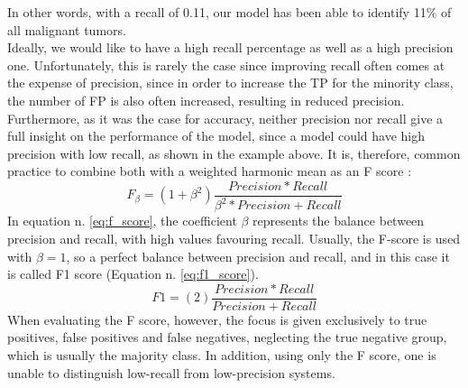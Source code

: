 In other words, with a recall of 0.11, our model has been able to identify 11\% of all malignant tumors. \\
Ideally, we would like to have a high recall percentage as well as a high precision one. Unfortunately, this is rarely the case since improving recall often comes at the expense of precision, since in order to increase the TP for the minority class, the number of FP is also often increased, resulting in reduced precision. \cite{10.5555/2559492}\\
Furthermore, as it was the case for accuracy, neither precision nor recall give a full insight on the performance of the model, since a model could have high precision with low recall, as shown in the example above. It is, therefore, common practice to combine both with a weighted harmonic mean as an F score \cite{Rijsbergen1974FOUNDATIONOE}:
\begin{equation}
F_\beta = (1+ \beta ^2)\dfrac{Precision * Recall}{\beta ^2* Precision + Recall}
\label{eq:f_score}    
\end{equation}
In equation n. \ref{eq:f_score}, the coefficient $\beta$ represents the balance between precision and recall, with high values favouring recall. Usually, the F-score is used with $\beta =1$, so a perfect balance between precision and recall, and in this case it is called F1 score (Equation n. \ref{eq:f1_score}). \cite{derczynski-2016-complementarity}
\begin{equation}
F1 = (2)\dfrac{Precision * Recall}{Precision + Recall}
\label{eq:f1_score}    
\end{equation}
When evaluating the F score, however, the focus is given exclusively to true positives, false positives and false negatives, neglecting the true negative group, which is usually the majority class. In addition, using only the F score, one is unable to distinguish low-recall from low-precision systems. \cite{derczynski-2016-complementarity}\\
